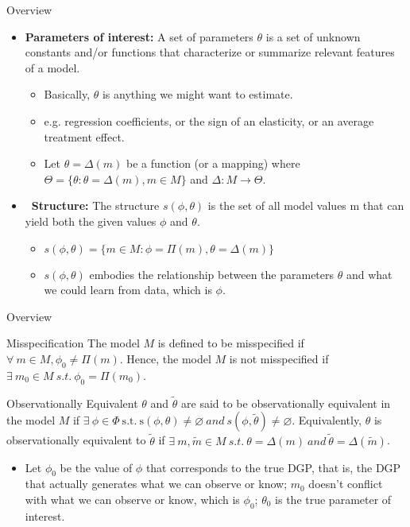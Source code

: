 \documentclass[aspectratio=169]{beamer}  %
\begin{document}
\begin{frame}{Overview}
    \begin{itemize}
    \item \textbf{Parameters of interest:} A set of parameters $\theta$ is a set of unknown constants and/or functions that characterize or summarize relevant features of a model. 
    \begin{itemize}
        \item Basically, $\theta$ is anything we might want to estimate.
        \item e.g. regression coefficients, or the sign of an elasticity, or an average treatment effect.
        \item Let $\theta =\Delta(m)$ be a function (or a mapping) where $\Theta=\{\theta: \theta=\Delta(m), m \in M\}$ and $\Delta{:}M\to\Theta$.
    \end{itemize}
    \item \textbf{\ Structure:} The structure $s(\phi,\theta)$ is the  set of all model values m that can yield both the given values $\phi$ and $\theta$.
    \begin{itemize}
    \item $s(\phi,\theta)=\{m\in M:\phi=\Pi(m),\theta=\Delta(m) \}$
    \item $s(\phi,\theta)$ embodies the relationship between the parameters $\theta$ and what we could learn from data, which is $\phi$.
    \end{itemize}
    \end{itemize}
\end{frame}

\begin{frame}{Overview}
    \begin{block}{Misspecification}
        The model $M$ is defined to be misspecified if $ \forall~m \in M,  \phi_0\neq\Pi(m)$. Hence, the model $M$ is not misspecified if $ \exists~m_0 \in M~s.t.~\phi_0 = \Pi(m_0)$.
    \end{block}

    \begin{block}{Observationally Equivalent}
        $\theta$ and $\tilde{\theta}$ are said to be observationally equivalent in the model $M$ if $\exists ~ \phi \in \Phi \mathrm{~s.t.~s}(\phi,\theta)\neq\varnothing~and~s(\phi,\tilde{\theta})\neq\varnothing$. Equivalently, $\theta$ is observationally equivalent to $\tilde{\theta}$ if $\exists ~ m,\tilde{m} \in M ~s.t.~\theta=\Delta(m)~and~\tilde{\theta}=\Delta(\tilde{m})$.
    \end{block}

    \begin{itemize}
        \item Let $\phi_0$ be the value of $\phi$  that corresponds to the true DGP, that is, the DGP that actually generates what we can observe or know; $m_0$ doesn't conflict with what we can observe or know, which is $\phi_0$; $\theta_0$ is the true parameter of interest.
    \end{itemize}
\end{frame}
\end{document}
